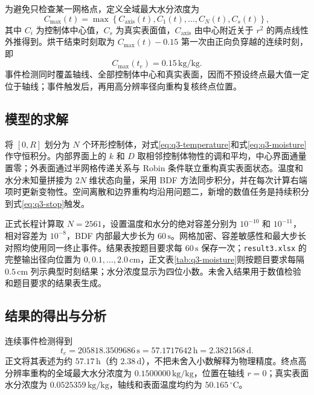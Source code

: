 为避免只检查某一网格点，定义全域最大水分浓度为
\begin{equation}
C_{\max}(t)=\max\left\{C_{\mathrm{axis}}(t),C_1(t),\ldots,C_N(t),C_s(t)\right\},
\label{eq:q3-cmax}
\end{equation}
其中 $C_i$ 为控制体中心值，$C_s$ 为真实表面值，$C_{\mathrm{axis}}$ 由中心附近关于 $r^2$ 的两点线性外推得到。烘干结束时刻取为 $C_{\max}(t)-0.15$ 第一次由正向负穿越的连续时刻，即
\begin{equation}
C_{\max}(t_e)=0.15\,\mathrm{kg/kg}.
\label{eq:q3-stop}
\end{equation}
事件检测同时覆盖轴线、全部控制体中心和真实表面，因而不预设终点最大值一定位于轴线；事件触发后，再用高分辨率径向重构复核终点位置。

\subsection{模型的求解}

将 $[0,R]$ 划分为 $N$ 个环形控制体，对式\eqref{eq:q3-temperature}和式\eqref{eq:q3-moisture}作守恒积分。内部界面上的 $k$ 和 $D$ 取相邻控制体物性的调和平均，中心界面通量置零；外表面通过半网格传递关系与 Robin 条件联立重构真实表面状态。温度和水分未知量拼接为 $2N$ 维状态向量，采用 BDF 方法同步积分，并在每次计算右端项时更新变物性。空间离散和边界重构均沿用问题二，新增的数值任务是持续积分到式\eqref{eq:q3-stop}触发。

正式长程计算取 $N=2561$，设置温度和水分的绝对容差分别为 $10^{-10}$ 和 $10^{-11}$，相对容差为 $10^{-8}$，BDF 内部最大步长为 $60\,\mathrm{s}$。网格加密、容差敏感性和最大步长对照均使用同一终止事件。结果表按题目要求每 $60\,\mathrm{s}$ 保存一次；\texttt{result3.xlsx} 的完整输出径向位置为 $0,0.1,\ldots,2.0\,\mathrm{cm}$，正文表\ref{tab:q3-moisture}则按题目要求每隔 $0.5\,\mathrm{cm}$ 列示典型时刻结果；水分浓度显示为四位小数。未舍入结果用于数值检验和题目要求的结果表生成。

\subsection{结果的得出与分析}

连续事件检测得到
\begin{equation}
t_e=205818.3509686\,\mathrm{s}=57.1717642\,\mathrm{h}=2.3821568\,\mathrm{d}.
\label{eq:q3-end-time}
\end{equation}
正文将其表述为约 $57.17\,\mathrm{h}$（约 $2.38\,\mathrm{d}$），不把未舍入小数解释为物理精度。终点高分辨率重构的全域最大水分浓度为 $0.1500000\,\mathrm{kg/kg}$，位置在轴线 $r=0$；真实表面水分浓度为 $0.0525359\,\mathrm{kg/kg}$，轴线和表面温度均约为 $50.165\,{}^\circ\mathrm{C}$。

